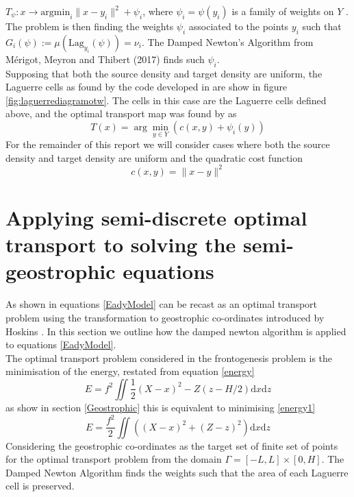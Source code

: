 $T_\psi: x \rightarrow \text{argmin}_i\| x - y_i \|^2 + \psi_i$, where $\psi_i = \psi(y_i)$ is a family of weights on $Y$ \cite{Merigot2017}.\\
\linebreak
 The problem is then finding the weights $\psi_i$ associated to the points $y_i$ such that $G_i(\psi) := \mu (\text{Lag}_{y_i}(\psi)) = \nu_i$. The Damped Newton's Algorithm from M\'{e}rigot, Meyron and Thibert (2017) \cite{Merigot2017} finds such $\psi_i$.
 \\
 \linebreak 
 Supposing that both the source density and target density are uniform, the Laguerre cells as found by the code developed in \cite{Merigot2017} are show in figure \ref{fig:laguerrediagramotw}. The cells in this case are the Laguerre cells defined above, and the optimal transport map was found by \cite{Merigot2017} as
 \begin{equation*}
 T(x) = \arg\min_{y\in Y}\left(c(x,y) + \psi_i(y)\right)
 \end{equation*}
For the remainder of this report we will consider cases where both the source density and target density are uniform and the quadratic cost function
\begin{equation*}
	c(x,y) = \| x - y \|^2
\end{equation*}
\section{Applying semi-discrete optimal transport to solving the semi-geostrophic equations}
As shown in \cite{Cullen2006a} equations \ref{EadyModel} can be recast as an optimal transport problem using the transformation to geostrophic co-ordinates introduced by Hoskins \cite{Hoskins1975}. In this section we outline how the damped newton algorithm is applied to equations \ref{EadyModel}.
\\
\linebreak
The optimal transport problem considered in the frontogenesis problem is the minimisation of the energy, restated from equation \ref{energy}
\begin{equation}
E = f^2 \iint \frac{1}{2}\left(X-x\right)^2 - Z\left(z - H/2\right)\textrm{d}x\textrm{d}z
\end{equation}
as show in section \ref{Geostrophic} this is equivalent to minimising \ref{energy1}
\begin{equation}
E = \frac{f^2}{2} \iint \left(\left(X-x\right)^2 + \left(Z - z\right)^2\right)\textrm{d}x\textrm{d}z
\end{equation}
Considering the geostrophic co-ordinates as the target set of finite set of points for the optimal transport problem from the domain $\Gamma = [-L,L] \times [0,H]$. The Damped Newton Algorithm finds the weights such that the area of each Laguerre cell is preserved.
